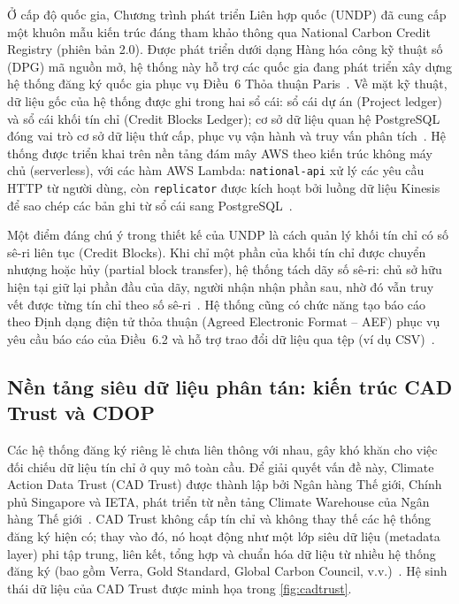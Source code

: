 Ở cấp độ quốc gia, Chương trình phát triển Liên hợp quốc (UNDP) đã cung cấp một khuôn mẫu kiến trúc đáng tham khảo thông qua National Carbon Credit Registry (phiên bản 2.0). Được phát triển dưới dạng Hàng hóa công kỹ thuật số (DPG) mã nguồn mở, hệ thống này hỗ trợ các quốc gia đang phát triển xây dựng hệ thống đăng ký quốc gia phục vụ Điều~6 Thỏa thuận Paris~\cite{undp2024nationalregistry}. Về mặt kỹ thuật, dữ liệu gốc của hệ thống được ghi trong hai sổ cái: sổ cái dự án (Project ledger) và sổ cái khối tín chỉ (Credit Blocks Ledger); cơ sở dữ liệu quan hệ PostgreSQL đóng vai trò cơ sở dữ liệu thứ cấp, phục vụ vận hành và truy vấn phân tích~\cite{undp2024nationalregistry}. Hệ thống được triển khai trên nền tảng đám mây AWS theo kiến trúc không máy chủ (serverless), với các hàm AWS Lambda: \texttt{national-api} xử lý các yêu cầu HTTP từ người dùng, còn \texttt{replicator} được kích hoạt bởi luồng dữ liệu Kinesis để sao chép các bản ghi từ sổ cái sang PostgreSQL~\cite{undp2024nationalregistry}.

Một điểm đáng chú ý trong thiết kế của UNDP là cách quản lý khối tín chỉ có số sê-ri liên tục (Credit Blocks). Khi chỉ một phần của khối tín chỉ được chuyển nhượng hoặc hủy (partial block transfer), hệ thống tách dãy số sê-ri: chủ sở hữu hiện tại giữ lại phần đầu của dãy, người nhận nhận phần sau, nhờ đó vẫn truy vết được từng tín chỉ theo số sê-ri~\cite{undp2024nationalregistry}. Hệ thống cũng có chức năng tạo báo cáo theo Định dạng điện tử thỏa thuận (Agreed Electronic Format -- AEF) phục vụ yêu cầu báo cáo của Điều~6.2 và hỗ trợ trao đổi dữ liệu qua tệp (ví dụ CSV)~\cite{undp2024nationalregistry}.

\subsection*{Nền tảng siêu dữ liệu phân tán: kiến trúc CAD Trust và CDOP}
\label{subsec:cadtrust}

Các hệ thống đăng ký riêng lẻ chưa liên thông với nhau, gây khó khăn cho việc đối chiếu dữ liệu tín chỉ ở quy mô toàn cầu. Để giải quyết vấn đề này, Climate Action Data Trust (CAD Trust) được thành lập bởi Ngân hàng Thế giới, Chính phủ Singapore và IETA, phát triển từ nền tảng Climate Warehouse của Ngân hàng Thế giới~\cite{cadtrust2025datamodel}. CAD Trust không cấp tín chỉ và không thay thế các hệ thống đăng ký hiện có; thay vào đó, nó hoạt động như một lớp siêu dữ liệu (metadata layer) phi tập trung, liên kết, tổng hợp và chuẩn hóa dữ liệu từ nhiều hệ thống đăng ký (bao gồm Verra, Gold Standard, Global Carbon Council, v.v.)~\cite{cadtrust2025datamodel}. Hệ sinh thái dữ liệu của CAD Trust được minh họa trong \autoref{fig:cadtrust}.

